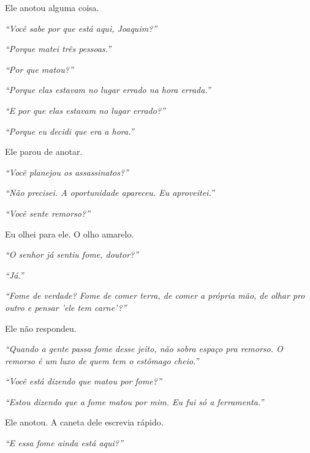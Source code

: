 \noindent Ele anotou alguma coisa.

\noindent \textit{\textquotedblleft{}Você sabe por que está aqui, Joaquim?\textquotedblright{}}

\noindent \textit{\textquotedblleft{}Porque matei três pessoas.\textquotedblright{}}

\noindent \textit{\textquotedblleft{}Por que matou?\textquotedblright{}}

\noindent \textit{\textquotedblleft{}Porque elas estavam no lugar errado na hora errada.\textquotedblright{}}

\noindent \textit{\textquotedblleft{}E por que elas estavam no lugar errado?\textquotedblright{}}

\noindent \textit{\textquotedblleft{}Porque eu decidi que era a hora.\textquotedblright{}}

\noindent Ele parou de anotar.

\noindent \textit{\textquotedblleft{}Você planejou os assassinatos?\textquotedblright{}}

\noindent \textit{\textquotedblleft{}Não precisei. A oportunidade apareceu. Eu aproveitei.\textquotedblright{}}

\noindent \textit{\textquotedblleft{}Você sente remorso?\textquotedblright{}}

\noindent Eu olhei para ele. O olho amarelo.

\noindent \textit{\textquotedblleft{}O senhor já sentiu fome, doutor?\textquotedblright{}}

\noindent \textit{\textquotedblleft{}Já.\textquotedblright{}}

\noindent \textit{\textquotedblleft{}Fome de verdade? Fome de comer terra, de comer a própria mão, de olhar pro outro e pensar 'ele tem carne'?\textquotedblright{}}

\noindent Ele não respondeu.

\noindent \textit{\textquotedblleft{}Quando a gente passa fome desse jeito, não sobra espaço pra remorso. O remorso é um luxo de quem tem o estômago cheio.\textquotedblright{}}

\noindent \textit{\textquotedblleft{}Você está dizendo que matou por fome?\textquotedblright{}}

\noindent \textit{\textquotedblleft{}Estou dizendo que a fome matou por mim. Eu fui só a ferramenta.\textquotedblright{}}

\noindent Ele anotou. A caneta dele escrevia rápido.

\noindent \textit{\textquotedblleft{}E essa fome ainda está aqui?\textquotedblright{}}

